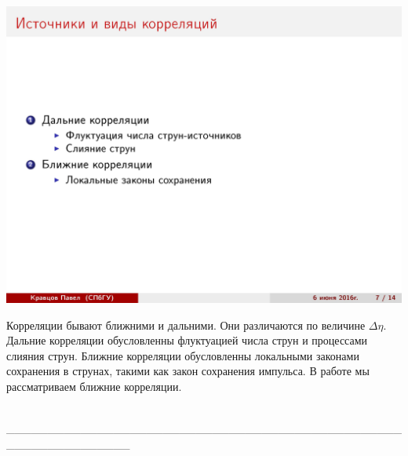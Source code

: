 \documentclass[14pt]{article}
\renewcommand{\line}{\\ \_\_\_\_\_\_\_\_\_\_\_\_\_\_\_\_\_\_\_\_\_\_\_\_\_\_\_\_\_\_\_\_\_\_\_\_\_\_\_\_\_\_\_\_\_\_\_\_\_\_\_\_\_\_\_\_\_\_\_\_\_\_\_ \\ }
\begin{document}
\begin{minipage}[h]{0.5\linewidth}
\includegraphics[width=1\linewidth]{page-07.jpg}
\end{minipage}
\begin{minipage}[h]{0.45\linewidth}
Корреляции бывают ближними и дальними. Они различаются по величине $\Delta \eta$. Дальние корреляции обусловленны флуктуацией числа струн и процессами слияния струн. Ближние корреляции обусловленны локальными законами сохранения в струнах, такими как закон сохранения импульса. В работе мы рассматриваем ближние корреляции.
\end{minipage}
\line
\end{document}
